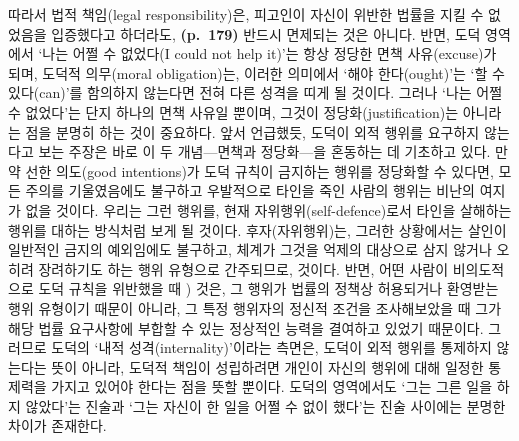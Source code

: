 따라서 법적 책임(legal responsibility)은, 피고인이 자신이 위반한 법률을
지킬 수 없었음을 입증했다고 하더라도, \textbf{(p.~179)} 반드시 면제되는
것은 아니다. 반면, 도덕 영역에서 `나는 어쩔 수 없었다(I could not help
it)'는 항상 정당한 면책 사유(excuse)가 되며, 도덕적 의무(moral
obligation)는, 이러한 의미에서 `해야 한다(ought)'는 `할 수 있다(can)'를
함의하지 않는다면 전혀 다른 성격을 띠게 될 것이다. 그러나 `나는 어쩔 수
없었다'는 단지 하나의 면책 사유일 뿐이며, 그것이 정당화(justification)는
아니라는 점을 분명히 하는 것이 중요하다. 앞서 언급했듯, 도덕이 외적
행위를 요구하지 않는다고 보는 주장은 바로 이 두 개념---면책과
정당화---을 혼동하는 데 기초하고 있다. 만약 선한 의도(good intentions)가
도덕 규칙이 금지하는 행위를 정당화할 수 있다면, 모든 주의를 기울였음에도
불구하고 우발적으로 타인을 죽인 사람의 행위는 비난의 여지가 없을 것이다.
우리는 그런 행위를, 현재 자위행위(self-defence)로서 타인을 살해하는
행위를 대하는 방식처럼 보게 될 것이다. 후자(자위행위)는, 그러한
상황에서는 살인이 일반적인 금지의 예외임에도 불구하고, 체계가 그것을
억제의 대상으로 삼지 않거나 오히려 장려하기도 하는 행위 유형으로
간주되므로,  것이다. 반면, 어떤 사람이
비의도적으로 도덕 규칙을 위반했을 때 ) 것은, 그
행위가 법률의 정책상 허용되거나 환영받는 행위 유형이기 때문이 아니라, 그
특정 행위자의 정신적 조건을 조사해보았을 때 그가 해당 법률 요구사항에
부합할 수 있는 정상적인 능력을 결여하고 있었기 때문이다. 그러므로 도덕의
`내적 성격(internality)'이라는 측면은, 도덕이 외적 행위를 통제하지
않는다는 뜻이 아니라, 도덕적 책임이 성립하려면 개인이 자신의 행위에 대해
일정한 통제력을 가지고 있어야 한다는 점을 뜻할 뿐이다. 도덕의 영역에서도
`그는 그른 일을 하지 않았다'는 진술과 `그는 자신이 한 일을 어쩔 수 없이
했다'는 진술 사이에는 분명한 차이가 존재한다.

